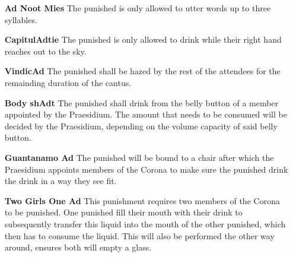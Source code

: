 \begin{itemize}
    \item[\textbf{Ad Noot Mies}] %
    The punished is only allowed to utter words up to three syllables.
    
    \item[\textbf{CapitulAdtie}] %
    The punished is only allowed to drink while their right hand reaches out to the sky.
    
    \item[\textbf{VindicAd}] %
    The punished shall be hazed by the rest of the attendees for the remainding duration of the cantus.
    
    \item[\textbf{Body shAdt}] %
    The punished shall drink from the belly button of a member appointed by the Praesidium. The amount that needs to be consumed will be decided by the Praesidium, depending on the volume capacity of said belly button.

    \item[\textbf{Guantanamo Ad}] %
    The punished will be bound to a chair after which the Praesidium appoints members of the Corona to make sure the punished drink the drink in a way they see fit.

    \item[\textbf{Two Girls One Ad}]%
    This punishment requires two members of the Corona to be punished. One punished fill their mouth with their drink to subsequently transfer this liquid into the mouth of the other punished, which then has to consume the liquid. This will also be performed the other way around, ensures both will empty a glass.

\end{itemize}